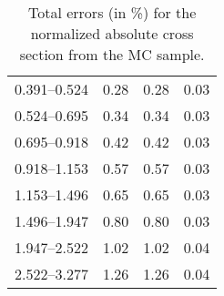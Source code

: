 \begin{table}
\begin{center}
\begin{tabular}{@{}l l l l@{}}
            0.391--0.524 & 0.28 & 0.28 & 0.03  \\
            0.524--0.695 & 0.34 & 0.34 & 0.03  \\
            0.695--0.918 & 0.42 & 0.42 & 0.03  \\
            0.918--1.153 & 0.57 & 0.57 & 0.03  \\
            1.153--1.496 & 0.65 & 0.65 & 0.03  \\
            1.496--1.947 & 0.80 & 0.80 & 0.03  \\
            1.947--2.522 & 1.02 & 1.02 & 0.04  \\
            2.522--3.277 & 1.26 & 1.26 & 0.04  \\
            \bottomrule
        \end{tabular}
    \end{center}
    \caption{
        Total errors (in \%) for the normalized absolute cross section from the
        \MADGRAPH MC sample.
    }
    \label{tab:madgraph_uncert_norm}
\end{table}
